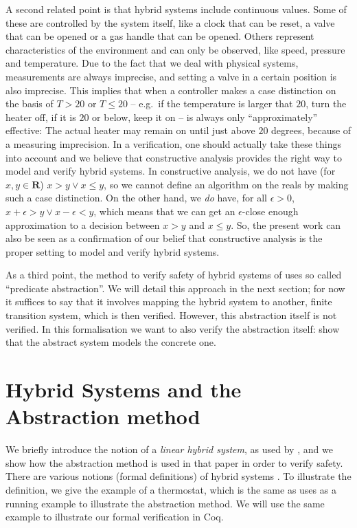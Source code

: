 \documentclass[runningheads]{llncs}
\renewcommand{\leq}{\leqslant}
\newcommand{\IR}{{\mathbf R}}
\begin{document}
A second related point is that hybrid systems include continuous
values. Some of these are controlled by the system itself, like a
clock that can be reset, a valve that can be opened or a gas handle
that can be opened. Others represent characteristics of the
environment and can only be observed, like speed, pressure and
temperature. Due to the fact that we deal with physical systems,
measurements are always imprecise, and setting a valve in a certain
position %
is also imprecise. 
This implies that when a controller makes a case distinction on the
basis of $T>20$ or $T\leq 20$ -- e.g.\ if the temperature is larger
that $20$, turn the heater off, if it is $20$ or below, keep it on --
is always only ``approximately'' effective: The actual heater may
remain on until just above $20$ degrees, because of a measuring
imprecision. In a verification, one should actually take these things
into account and we believe that constructive analysis provides the
right way to model and verify hybrid systems. In constructive
analysis, we do not have (for $x,y\in\IR$) $x>y \vee x\leq y$, so we
cannot define an algorithm on the reals by making such a case
distinction. On the other hand, we {\em do\/} have, for all
$\epsilon>0$, $x+\epsilon>y \vee x-\epsilon< y$, which means that we
can get an $\epsilon$-close enough approximation to a decision between
$x>y$ and $x\leq y$.  So, the present work can also be seen as a
confirmation of our belief that constructive analysis is the
proper setting to model and verify hybrid systems.

As a third point, the method to verify safety of hybrid systems of
\cite{alur} uses so called ``predicate abstraction''. We will detail
this approach in the next section; for now it suffices to say that it
involves mapping the hybrid system to another, finite transition
system, which is then verified. However, this abstraction itself is
not verified. In this formalisation we want to also verify the
abstraction itself: show that the abstract system models the concrete
one.


\section{Hybrid Systems and the Abstraction method}
\label{sec:hybsys}
We briefly introduce the notion of a {\em linear hybrid system}, as
used by \cite{alur}, and we show how the abstraction method is used in
that paper in order to verify safety. There are various notions
(formal definitions) of hybrid systems
\cite{henziger,lynchvaandrager}. To illustrate the definition, we give
the example of a thermostat, which is the same as \cite{alur} uses as
a running example to illustrate the abstraction method. We will use
the same example to illustrate our formal verification in Coq.
\end{document}
